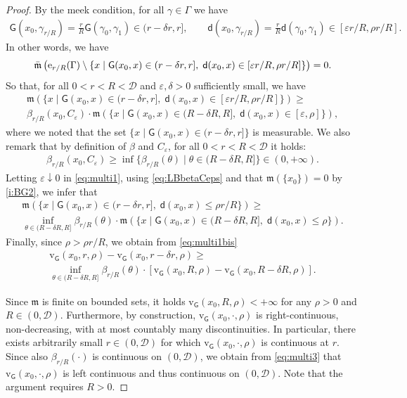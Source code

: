 \documentclass[11pt,a4paper]{article}
\theoremstyle{plain}
\theoremstyle{definition}
\theoremstyle{remark}
\numberwithin{equation}{section}
\newcommand{\ve}{\varepsilon}
\newcommand{\cD}{\mathcal{D}}
\newcommand{\rv}{\mathrm{v}}
\newcommand{\mm}{\mathfrak m}
\newcommand{\ee}{{\rm e}}
\newcommand{\sfd}{\mathsf d}
\newcommand{\sfG}{\mathsf G}
\begin{document}
\begin{proof}
 By the meek condition, for all $\gamma\in \Gamma$ we have 
\begin{align}
\sfG(x_0,\gamma_{r/R})  = \frac{r}{R}\sfG(\gamma_0,\gamma_1) \in (r-\delta r,r], \qquad \sfd(x_0,\gamma_{r/R})  = \frac{r}{R}\sfd(\gamma_0,\gamma_1) \in [ \ve r/R,\rho r/R].
\end{align}
In other words, we have
\begin{equation}
\bar{\mm}\left(\ee_{r/R}(\Gamma) \setminus \{x \mid \sfG(x_0,x) \in (r-\delta r,r],\; \sfd(x_0,x)  \in [ \ve r/R,\rho r/R]\}\right) =0.
\end{equation}
So that,  for all $0<r<R<\cD$ and $ \ve,\delta>0$ sufficiently small, we have
\begin{multline}\label{eq:multi1}
\mm\left(\{x\mid \sfG(x_0,x) \in (r-\delta r,r],\;  \sfd(x_0,x)  \in [ \ve r/R,\rho r/R]\}\right) \geq  \\
\beta_{r/R}(x_0,C_{\ve}) \cdot \mm\left(\{x\mid \sfG(x_0,x) \in (R-\delta R,R],\;  \sfd(x_0,x)\in [\ve, \rho]\}\right),
\end{multline}
where we noted that the set $\{x\mid \sfG(x_0,x) \in (r-\delta r,r]\}$ is measurable. We also remark that by definition of $\beta$ and $C_{\ve}$, for all $0<r<R<\cD$ it holds:
\begin{align}\label{eq:LBbetaCeps}
\beta_{r/R}(x_0,C_{\ve}) \geq \inf \{\beta_{r/R}(\theta)\mid \theta \in (R-\delta R,R]\} \in (0,+\infty).
\end{align}
 Letting  $\ve\downarrow 0$ in \eqref{eq:multi1}, using \eqref{eq:LBbetaCeps} and that $\mm(\{x_{0}\})=0$ by  \ref{i:BG2}, we infer that
\begin{multline}\label{eq:multi1bis}
\mm\left(\{x\mid \sfG(x_0,x) \in (r-\delta r,r],\;  \sfd(x_0,x)  \leq \rho r/R\}\right) \geq  \\
\inf_{\theta \in (R-\delta R,R]} \beta_{r/R}(\theta) \cdot \mm\left(\{x\mid \sfG(x_0,x) \in (R-\delta R,R],\;  \sfd(x_0,x) \leq \rho \}\right).
\end{multline}
Finally, since $\rho>  \rho r/R$, we obtain from \eqref{eq:multi1bis}
\begin{multline}\label{eq:multi3}
\rv_{\sfG}(x_0,r,\rho) -\rv_{\sfG}(x_0,r-\delta r,\rho) \geq \\
\inf_{\theta \in (R-\delta R,R]} \beta_{r/R}(\theta) \cdot \left[\rv_{\sfG}(x_0,R,\rho) - \rv_{\sfG}(x_0,R-\delta R,\rho)\right].
\end{multline}

Since $\mm$ is finite on bounded sets, it holds $\rv_{\sfG}(x_0,R,\rho)<+\infty$  for any $\rho>0$ and $R \in (0,\cD)$. Furthermore, by construction, $\rv_{\sfG}(x_0,\cdot,\rho)$ is right-con\-tinuous, non-decreasing, with at most countably many discontinuities. In particular, there exists arbitrarily small $r \in (0,\cD)$ for which $\rv_{\sfG}(x_0,\cdot,\rho)$ is continuous at $r$. Since also $\beta_{r/R}(\cdot)$ is continuous on $(0,\cD)$, we obtain from \eqref{eq:multi3} that $\rv_{\sfG}(x_0,\cdot,\rho)$ is left continuous and thus continuous on $(0,\cD)$. Note that the argument requires $R>0$.


\end{proof}
\end{document}
